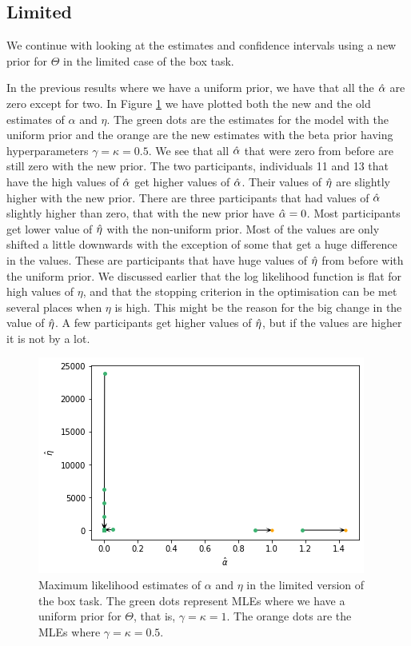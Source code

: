 \subsection{Limited}
We continue with looking at the estimates and confidence intervals using a new prior for $\Theta$ in the limited case of the box task. 

In the previous results where we have a uniform prior, we have that all the $\hat{\alpha}$ are zero except for two. In Figure \ref{fig:sensitivity_mles_lim_a_e} we have plotted both the new and the old estimates of $\alpha$ and $\eta$. The green dots are the estimates for the model with the uniform prior and the orange are the new estimates with the beta prior having hyperparameters $\gamma=\kappa=0.5$. 
We see that all $\hat{\alpha}$ that were zero from before are still zero with the new prior. The two participants, individuals 11 and 13 that have the high values of $\hat{\alpha}$ get higher values of $\hat{\alpha}$. Their values of $\hat{\eta}$ are slightly higher with the new prior. 
There are three participants that had values of $\hat{\alpha}$ slightly higher than zero, that with the new prior have $\hat{\alpha}=0$. 
Most participants get lower value of $\hat{\eta}$ with the non-uniform prior. Most of the values are only shifted a little downwards with the exception of some that get a huge difference in the values. These are participants that have huge values of $\hat{\eta}$ from before with the uniform prior. We discussed earlier that the log likelihood function is flat for high values of $\eta$, and that the stopping criterion in the optimisation can be met several places when $\eta$ is high. This might be the reason for the big change in the value of $\hat{\eta}$. 
A few participants get higher values of $\hat{\eta}$, but if the values are higher it is not by a lot. 
\begin{figure}
    \centering
    \includegraphics[scale=0.8]{pictures/Sensitivity/mles_lim_a_e.png}
    \caption[MLEs of $\alpha$ and $\eta$ for prior with $\gamma=\kappa=1$ and $\gamma=\kappa=0.5$, limited]{
    Maximum likelihood estimates of $\alpha$ and $\eta$ in the limited version of the box task. The green dots represent MLEs where we have a uniform prior for $\Theta$, that is, $\gamma=\kappa=1$. The orange dots are the MLEs where $\gamma=\kappa=0.5$.}
    \label{fig:sensitivity_mles_lim_a_e}
\end{figure}

